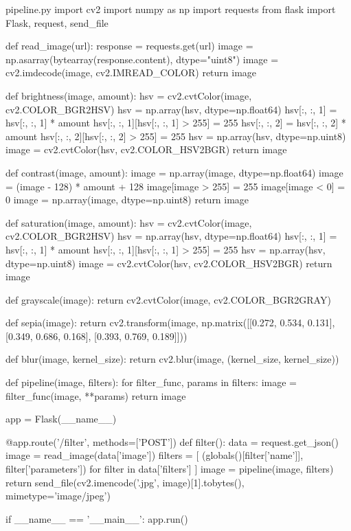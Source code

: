 \documentclass{csse4400}
\begin{document}
\begin{code}[language=python]{pipeline.py}
import cv2
import numpy as np
import requests
from flask import Flask, request, send_file

def read_image(url):
    response = requests.get(url)
    image = np.asarray(bytearray(response.content), dtype="uint8")
    image = cv2.imdecode(image, cv2.IMREAD_COLOR)
    return image

def brightness(image, amount):
    hsv = cv2.cvtColor(image, cv2.COLOR_BGR2HSV)
    hsv = np.array(hsv, dtype=np.float64)
    hsv[:, :, 1] = hsv[:, :, 1] * amount
    hsv[:, :, 1][hsv[:, :, 1] > 255] = 255
    hsv[:, :, 2] = hsv[:, :, 2] * amount
    hsv[:, :, 2][hsv[:, :, 2] > 255] = 255
    hsv = np.array(hsv, dtype=np.uint8)
    image = cv2.cvtColor(hsv, cv2.COLOR_HSV2BGR)
    return image

def contrast(image, amount):
    image = np.array(image, dtype=np.float64)
    image = (image - 128) * amount + 128
    image[image > 255] = 255
    image[image < 0] = 0
    image = np.array(image, dtype=np.uint8)
    return image

def saturation(image, amount):
    hsv = cv2.cvtColor(image, cv2.COLOR_BGR2HSV)
    hsv = np.array(hsv, dtype=np.float64)
    hsv[:, :, 1] = hsv[:, :, 1] * amount
    hsv[:, :, 1][hsv[:, :, 1] > 255] = 255
    hsv = np.array(hsv, dtype=np.uint8)
    image = cv2.cvtColor(hsv, cv2.COLOR_HSV2BGR)
    return image

def grayscale(image):
    return cv2.cvtColor(image, cv2.COLOR_BGR2GRAY)

def sepia(image):
    return cv2.transform(image, np.matrix([[0.272, 0.534, 0.131],
                                           [0.349, 0.686, 0.168],
                                           [0.393, 0.769, 0.189]]))

def blur(image, kernel_size):
    return cv2.blur(image, (kernel_size, kernel_size))

def pipeline(image, filters):
    for filter_func, params in filters:
        image = filter_func(image, **params)
    return image

app = Flask(__name__)

@app.route('/filter', methods=['POST'])
def filter():
    data = request.get_json()
    image = read_image(data['image'])
    filters = [
        (globals()[filter['name']], filter['parameters'])
        for filter in data['filters']
    ]
    image = pipeline(image, filters)
    return send_file(cv2.imencode('.jpg', image)[1].tobytes(),
                     mimetype='image/jpeg')

if __name__ == '__main__':
    app.run()
\end{code}
\end{document}
